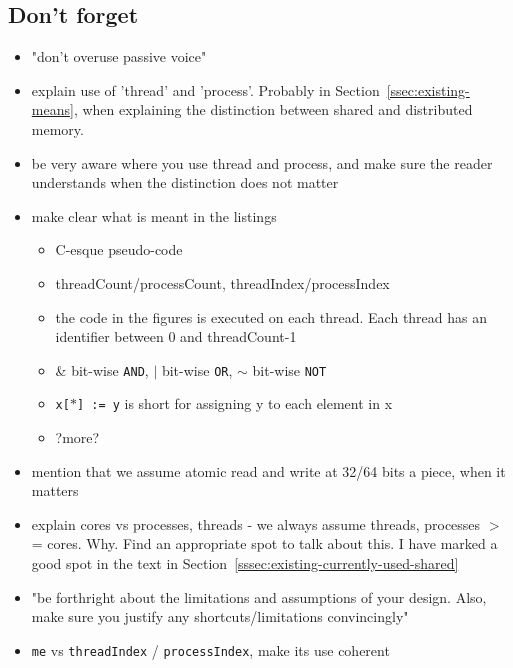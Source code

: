 \documentclass[a4paper, 10pt]{article}
\begin{document}
\begin{enumerate}
\section{Don't forget}
\begin{itemize}
	\item "don't overuse passive voice"
	\item explain use of 'thread' and 'process'. Probably in Section~\ref{ssec:existing-means}, when explaining the distinction between shared and distributed memory.
	\item be very aware where you use thread and process, and make sure the reader understands when the distinction does not matter
	\item make clear what is meant in the listings
		\begin{itemize}
			\item C-esque pseudo-code
			\item threadCount/processCount,  threadIndex/processIndex
			\item the code in the figures is executed on each thread. Each thread has an identifier between 0 and threadCount-1
			\item \& bit-wise \texttt{AND}, $|$ bit-wise \texttt{OR}, $\sim$ bit-wise \texttt{NOT}
			\item \texttt{x[$*$] := y} is short for assigning y to each element in x
			\item ?more?
		\end{itemize}
	\item mention that we assume atomic read and write at 32/64 bits a piece, when it matters
	\item explain cores vs processes, threads - we always assume threads, processes $>$= cores. Why. Find an appropriate spot to talk about this. I have marked a good spot in the text in Section~\ref{sssec:existing-currently-used-shared}
	\item "be forthright about the limitations and assumptions of your design. Also, make sure you justify any shortcuts/limitations convincingly"
	\item \texttt{me} vs \texttt{threadIndex} / \texttt{processIndex}, make its use coherent
\end{itemize}


\end{enumerate}
\end{document}
